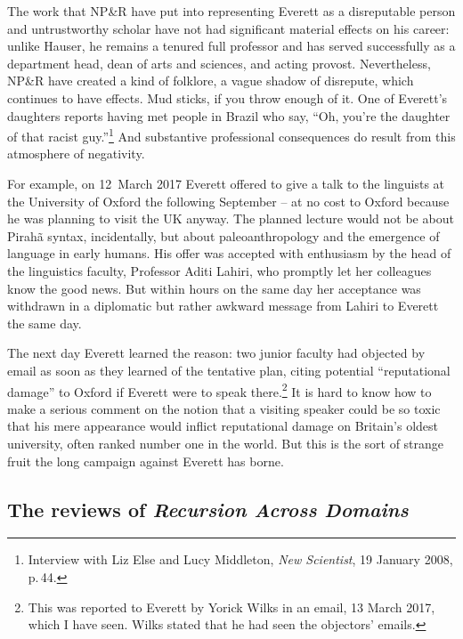 \documentclass[output=paper,colorlinks,citecolor=brown
]{langscibook}
\begin{document}
The work that NP\&R have put into representing Everett as a disreputable
person and untrustworthy scholar have not had significant material effects
on his career: unlike Hauser, he remains a tenured full professor and has
served successfully as a department head, dean of arts and sciences, and
acting provost. Nevertheless, NP\&R have created a kind of folklore, a
vague shadow of disrepute, which continues to have effects. Mud sticks,
if you throw enough of it. One of Everett's daughters reports having met
people in Brazil who say, ``Oh, you're the daughter of that racist
guy.''\footnote{%
   Interview with Liz Else and Lucy Middleton, \textit{New Scientist},
   19 January 2008, p.\,44.}
And substantive professional consequences do result from this atmosphere
of negativity.

For example, on 12~March 2017 Everett offered to give a talk to the
linguists at the University of Oxford the following September -- at
no cost to Oxford because he was planning to visit the UK anyway. The
planned lecture would not be about Pirah{\~a} syntax, incidentally,
but about paleoanthropology and the emergence of language in early
humans. His offer was accepted with enthusiasm by the head of the
linguistics faculty, Professor Aditi Lahiri, who promptly let her
colleagues know the good news. But within hours on the same day her
acceptance was withdrawn in a diplomatic but rather awkward message
from Lahiri to Everett the same day.

The next day Everett learned the reason: two junior faculty had
objected by email as soon as they learned of the tentative plan,
citing potential ``reputational damage'' to Oxford if Everett were to
speak there.\footnote{%
   This was reported to Everett by Yorick Wilks in an email,
   13 March 2017, which I have seen. Wilks stated that he had seen
   the objectors' emails.}
It is hard to know how to make a serious comment on the notion that
a visiting speaker could be so toxic that his mere appearance would
inflict reputational damage on Britain's oldest university, often
ranked number one in the world. But this is the sort of strange fruit
the long campaign against Everett has borne.

\subsection{The reviews of \textit{Recursion Across Domains}}
\end{document}
